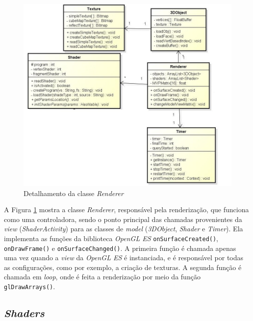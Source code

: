	\begin{figure}[ht!]
	\centering
		\includegraphics[keepaspectratio=true,scale=0.6]{figuras/renderer.jpg}
	\caption{Detalhamento da classe \textit{Renderer}}
	\label{renderer}
	\end{figure}

	A Figura \ref{renderer} mostra a classe \textit{Renderer}, responsável pela renderização, que funciona como uma controladora, sendo o ponto principal  das chamadas provenientes da \textit{view} (\textit{ShaderActivity}) para as classes de \textit{model} (\textit{3DObject}, \textit{Shader} e \textit{Timer}). Ela implementa as funções da biblioteca \textit{OpenGL ES} \texttt{onSurfaceCreated()},  \texttt{onDrawFrame()} e \texttt{onSurfaceChanged()}. A primeira função é chamada apenas uma vez quando a \textit{view} da \textit{OpenGL ES} é instanciada, e é responsável por todas as configurações, como por exemplo, a criação de texturas. A segunda função é chamada em \textit{loop}, onde é feita a renderização por meio da função \texttt{glDrawArrays()}. 

\subsection{\textit{Shaders}}      

